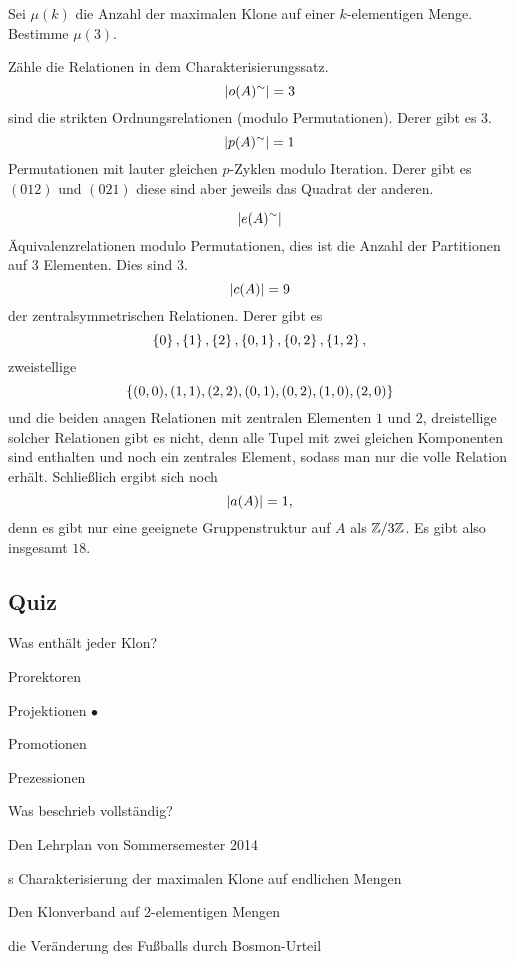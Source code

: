 \documentclass{book}
\begin{document}
\begin{exercise}
    Sei $\mu(k)$ die Anzahl der maximalen Klone auf einer $k$-elementigen Menge. Bestimme $\mu(3)$.
\end{exercise}

\begin{solution}
Zähle die Relationen in dem Charakterisierungssatz.
$$\left|o(A)^{\sim}\right|=3$$
sind die strikten Ordnungsrelationen (modulo Permutationen). Derer gibt es $3$.
$$\left|p(A)^{\sim}\right|=1$$
Permutationen mit lauter gleichen $p$-Zyklen modulo Iteration. Derer gibt es $(012)$ und $(021)$ diese sind aber jeweils das Quadrat der anderen.

$$\left|e(A)^{\sim}\right|$$
Äquivalenzrelationen modulo Permutationen, dies ist die Anzahl der Partitionen auf $3$ Elementen. Dies sind $3$.
$$\left|c(A)\right|=9$$
der zentralsymmetrischen Relationen. Derer gibt es
$$\left\{0\right\},\left\{1\right\},\left\{2\right\}, \left\{0,1\right\}, \left\{0,2\right\}, \left\{1,2\right\},$$ zweistellige $$\left\{(0,0),(1,1),(2,2),(0,1),(0,2),(1,0),(2,0)\right\}$$
und die beiden anagen Relationen mit zentralen Elementen $1$ und $2$, dreistellige solcher Relationen gibt es nicht, denn alle Tupel mit zwei gleichen Komponenten sind enthalten und noch ein zentrales Element, sodass man nur die volle Relation erhält.    
Schließlich ergibt sich noch
$$
\left|a(A)\right|=1,
$$
denn es gibt nur eine geeignete Gruppenstruktur auf $A$ als $\mathbb{Z}/ 3\mathbb{Z}$.
Es gibt also insgesamt $18$.
\end{solution}

\subsection{Quiz}

\begin{exercise}
Was enthält jeder Klon?
\begin{tasks}
        \item Prorektoren
        \item Projektionen $\bullet$
        \item Promotionen
        \item Prezessionen
\end{tasks}

\end{exercise}

\begin{exercise}
Was beschrieb  vollständig?
\begin{tasks}
    \item Den Lehrplan von Sommersemester 2014
    \item {}s Charakterisierung der maximalen Klone auf endlichen Mengen
    \item Den Klonverband auf 2-elementigen Mengen
    \item die Veränderung des Fußballs durch Bosmon-Urteil    
\end{tasks}
\end{exercise}
\end{document}
